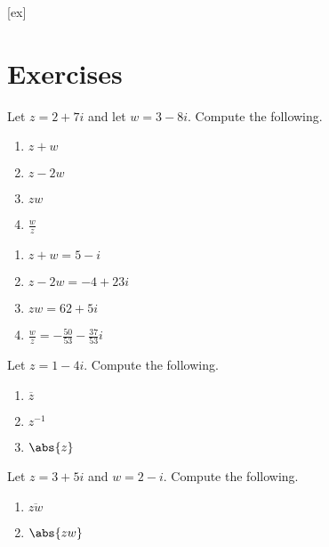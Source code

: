 [ex]
\section*{Exercises}

\begin{enumialphparenastyle}

\begin{ex} Let $z=2+7i$ and let $w=3-8i.$ Compute the following.

\begin{enumerate}
\item $z + w$

\item $z - 2w$

\item $zw$

\item $\frac{w}{z}$
\end{enumerate}
\begin{sol}
\begin{enumerate}
\item $z + w = 5-i$
\item $z - 2w = -4 + 23i$
\item $zw = 62+5i$ 
\item $\frac{w}{z} = -\frac{50}{53}-\frac{37}{53}i$
\end{enumerate}
\end{sol}
\end{ex}

\begin{ex} Let $z = 1 - 4i$. Compute the following.

\begin{enumerate}

\item $\overline{z}$

\item $z^{-1}$

\item $\abs{z}$
\end{enumerate}
\end{ex}

\begin{ex} Let $z = 3 +5i$ and $w = 2 - i$. Compute the following.

\begin{enumerate}
\item $\overline{zw}$

\item $\abs{zw}$


\end{enumerate}
\end{ex}
\end{enumialphparenastyle}
